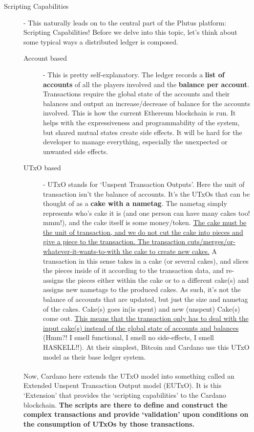 \documentclass[a4paper, 11pt]{article}
\begin{document}
\begin{description}
        \item[Scripting Capabilities] - This naturally leads on to the central part of the Plutus platform: Scripting Capabilities! Before we delve into this topic, let's think about some typical ways a distributed ledger is composed.
        
        \begin{description}
            \item[Account based] - This is pretty self-explanatory. The ledger records a \textbf{list of accounts} of all the players involved and the \textbf{balance per account}. Transactions require the global state of the accounts and their balances and output an increase/decrease of balance for the accounts involved. This is how the current Ethereum blockchain is run. It helps with the expressiveness and programmability of the system, but shared mutual states create side effects. It will be hard for the developer to manage everything, especially the unexpected or unwanted side effects.
            \item[UTxO based] - UTxO stands for `Unspent Transaction Outputs'. Here the unit of transaction isn't the balance of accounts. It's the UTxOs that can be thought of as a \textbf{cake with a nametag}. The nametag simply represents who's cake it is (and one person can have many cakes too! mmm!), and the cake itself is some money/token. \ul{The cake must be the unit of transaction, and we do not cut the cake into pieces and give a piece to the transaction. The transaction cuts/merges/or-whatever-it-wants-to-with the cake to create new cakes.} A transaction in this sense takes in a cake (or several cakes), and slices the pieces inside of it according to the transaction data, and re-assigns the pieces either within the cake or to a different cake(s) and assigns new nametags to the produced cakes. As such, it's not the balance of accounts that are updated, but just the size and nametag of the cakes. Cake(s) goes in(is spent) and new (unspent) Cake(s) come out. \ul{This means that the transaction only has to deal with the input cake(s) instead of the global state of accounts and balances} (Hmm?! I smell functional, I smell no side-effects, I smell HASKELL!!). At their simplest, Bitcoin and Cardano use this UTxO model as their base ledger system.
        \end{description}
        
        \paragraph{} Now, Cardano here extends the UTxO model into something called an Extended Unspent Transaction Output model (EUTxO). It is this `Extension' that provides the `scripting capabilities' to the Cardano blockchain. \textbf{The scripts are there to define and construct the complex transactions and provide `validation' upon conditions on the consumption of UTxOs by those transactions.} 
        

\end{description}
\end{document}
